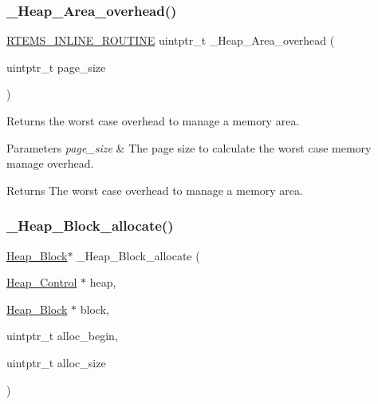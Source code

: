 \subsubsection{\texorpdfstring{\_Heap\_Area\_overhead()}{\_Heap\_Area\_overhead()}}
{\footnotesize\ttfamily \mbox{\hyperlink{group__RTEMSScoreBaseDefs_gac216239df231d5dbd15e3520b0b9313f}{R\+T\+E\+M\+S\+\_\+\+I\+N\+L\+I\+N\+E\+\_\+\+R\+O\+U\+T\+I\+NE}} uintptr\+\_\+t \+\_\+\+Heap\+\_\+\+Area\+\_\+overhead (\begin{DoxyParamCaption}\item[{uintptr\+\_\+t}]{page\+\_\+size }\end{DoxyParamCaption})}



Returns the worst case overhead to manage a memory area. 


\begin{DoxyParams}{Parameters}
{\em page\+\_\+size} & The page size to calculate the worst case memory manage overhead.\\
\hline
\end{DoxyParams}
\begin{DoxyReturn}{Returns}
The worst case overhead to manage a memory area. 
\end{DoxyReturn}
\mbox{\label{group__RTEMSScoreHeap_ga4e78547be096281a6f5189402e639cd8}} 
\subsubsection{\texorpdfstring{\_Heap\_Block\_allocate()}{\_Heap\_Block\_allocate()}}
{\footnotesize\ttfamily \mbox{\hyperlink{structHeap__Block}{Heap\+\_\+\+Block}}$\ast$ \+\_\+\+Heap\+\_\+\+Block\+\_\+allocate (\begin{DoxyParamCaption}\item[{\mbox{\hyperlink{structHeap__Control}{Heap\+\_\+\+Control}} $\ast$}]{heap,  }\item[{\mbox{\hyperlink{structHeap__Block}{Heap\+\_\+\+Block}} $\ast$}]{block,  }\item[{uintptr\+\_\+t}]{alloc\+\_\+begin,  }\item[{uintptr\+\_\+t}]{alloc\+\_\+size }\end{DoxyParamCaption})}



